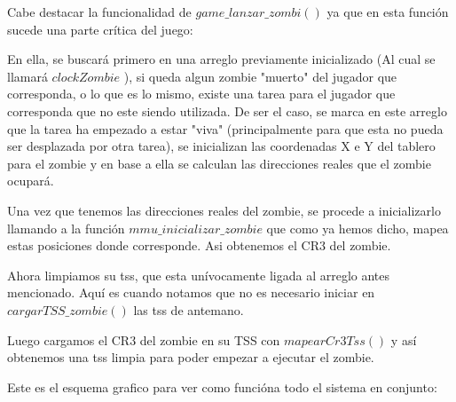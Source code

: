 \documentclass[a4paper]{article}
\begin{document}
Cabe destacar la funcionalidad de $game\_ lanzar\_ zombi()$ ya que en esta función sucede una parte crítica del juego:

En ella, se buscará primero en una arreglo previamente inicializado (Al cual se llamará $clockZombie$ ), si queda algun zombie "muerto" del jugador que corresponda, o lo que es lo mismo, existe una tarea para el jugador que corresponda que no este siendo utilizada. De ser el caso, se marca en este arreglo que la tarea ha empezado a estar "viva" (principalmente para que esta no pueda ser desplazada por otra tarea), se inicializan las coordenadas X e Y del tablero para el zombie y en base a ella se calculan las direcciones reales que el zombie ocupará.

Una vez que tenemos las direcciones reales del zombie, se procede a inicializarlo llamando a la función $mmu\_ inicializar\_ zombie$ que como ya hemos dicho, mapea estas posiciones donde corresponde. Asi obtenemos el CR3 del zombie.

Ahora limpiamos su tss, que esta unívocamente ligada al arreglo antes mencionado. Aquí es cuando notamos que no es necesario iniciar en $cargarTSS\_ zombie()$ las tss de antemano.

Luego cargamos el CR3 del zombie en su TSS con $mapearCr3Tss()$ y así obtenemos una tss limpia para poder empezar a ejecutar el zombie.

Este es el esquema grafico para ver como funcióna todo el sistema en conjunto:
\end{document}
